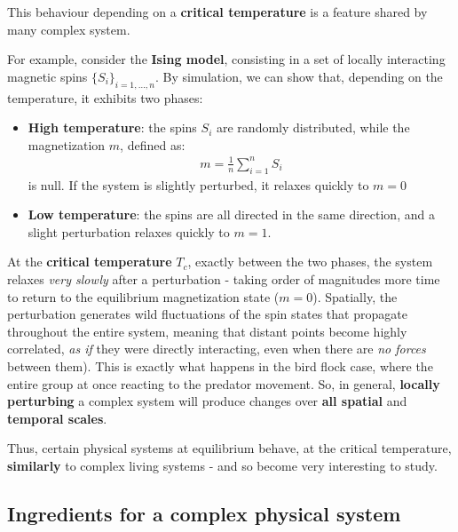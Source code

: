 \documentclass[../../main.tex]{subfiles}
\begin{document}
\medskip

This behaviour depending on a \textbf{critical temperature} is a feature shared by many complex system.

For example, consider the \textbf{Ising model}, consisting in a set of locally interacting magnetic spins $\{S_i\}_{i=1,\dots,n}$. By simulation, we can show that, depending on the temperature, it exhibits two phases:
\begin{itemize}
    \item \textbf{High temperature}: the spins $S_i$ are randomly distributed, while the magnetization $m$, defined as:
    \begin{align*}
        m = \frac{1}{n} \sum_{i=1}^n S_i    
    \end{align*}
    is null. If the system is slightly perturbed, it relaxes quickly to $m=0$
    \item \textbf{Low temperature}: the spins are all directed in the same direction, and a slight perturbation relaxes quickly to $m=1$.  
\end{itemize}
At the \textbf{critical temperature} $T_c$, exactly between the two phases, the system relaxes \textit{very slowly} after a perturbation - taking order of magnitudes more time to return to the equilibrium magnetization state ($m=0$). Spatially, the perturbation generates wild fluctuations of the spin states that propagate throughout the entire system, meaning that distant points become highly correlated, \textit{as if} they were directly interacting, even when there are \textit{no forces} between them). This is exactly what happens in the bird flock case, where the entire group  at once reacting to the predator movement.
So, in general, \textbf{locally perturbing} a complex system will produce changes over \textbf{all spatial} and \textbf{temporal scales}. 

\medskip

Thus, certain physical systems at equilibrium behave, at the critical temperature, \textbf{similarly}  to complex living systems - and so become very interesting to study. 

\subsection{Ingredients for a complex physical system}
\end{document}
